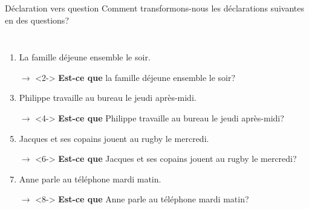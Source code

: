 \begin{frame}{Déclaration vers question}
  Comment transformons-nous les déclarations suivantes en des questions? \\
  \begin{columns}
      \scriptsize
      \begin{enumerate}
        \item La famille déjeune ensemble le soir.
        \item[$\to$]<2-> \textbf{Est-ce que} la famille déjeune ensemble le soir?
        \item Philippe travaille au bureau le jeudi après-midi.
        \item[$\to$]<4-> \textbf{Est-ce que} Philippe travaille au bureau le jeudi après-midi?
        \item Jacques et ses copains jouent au rugby le mercredi.
        \item[$\to$]<6-> \textbf{Est-ce que} Jacques et ses copains jouent au rugby le mercredi?
        \item Anne parle au téléphone mardi matin.
        \item[$\to$]<8-> \textbf{Est-ce que} Anne parle au téléphone mardi matin?
      \end{enumerate}
      \begin{minipage}[c][0.6\textheight]{\linewidth}
        \begin{center}
        \end{center}
      \end{minipage}
  \end{columns}
\end{frame}